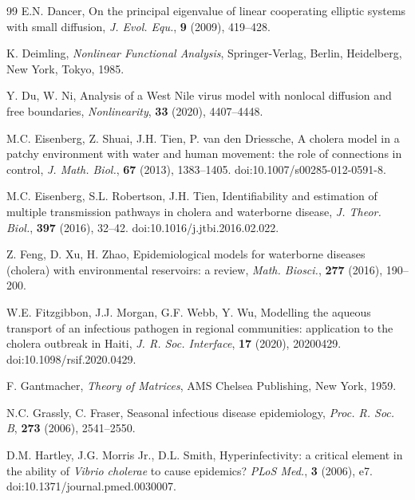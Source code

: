 \documentclass[a4paper,11pt]{amsart}
\theoremstyle{definition}
\numberwithin{equation}{section}
\theoremstyle{definition}
\begin{document}
\begin{thebibliography}{99}
E.N. Dancer,
On the principal eigenvalue of linear cooperating elliptic systems with small diffusion,
\textit{J. Evol. Equ.}, \textbf{9} (2009), 419--428.

K. Deimling,
\textit{Nonlinear Functional Analysis},
Springer-Verlag, Berlin, Heidelberg, New York, Tokyo, 1985.







Y. Du, W. Ni,
Analysis of a West Nile virus model with nonlocal diffusion and free boundaries,
\textit{Nonlinearity}, \textbf{33} (2020), 4407--4448.






M.C. Eisenberg, Z. Shuai, J.H. Tien, P. van den Driessche,
A cholera model in a patchy environment with water and human movement: the role of connections in control,
\textit{J. Math. Biol.}, \textbf{67} (2013), 1383--1405.
doi:10.1007/s00285-012-0591-8.

M.C. Eisenberg, S.L. Robertson, J.H. Tien,
Identifiability and estimation of multiple transmission pathways in cholera and waterborne disease,
\textit{J. Theor. Biol.}, \textbf{397} (2016), 32--42.
doi:10.1016/j.jtbi.2016.02.022.




Z. Feng, D. Xu, H. Zhao,
Epidemiological models for waterborne diseases (cholera) with environmental reservoirs: a review,
\textit{Math. Biosci.}, \textbf{277} (2016), 190--200.

W.E. Fitzgibbon, J.J. Morgan, G.F. Webb, Y. Wu,
Modelling the aqueous transport of an infectious pathogen in regional communities: application to the cholera outbreak in Haiti,
\textit{J. R. Soc. Interface}, \textbf{17} (2020), 20200429.
doi:10.1098/rsif.2020.0429.



F. Gantmacher,
\textit{Theory of Matrices},
AMS Chelsea Publishing, New York, 1959.

N.C. Grassly, C. Fraser,
Seasonal infectious disease epidemiology,
\textit{Proc. R. Soc. B}, \textbf{273} (2006), 2541--2550.



D.M. Hartley, J.G. Morris Jr., D.L. Smith,
Hyperinfectivity: a critical element in the ability of \textit{Vibrio cholerae} to cause epidemics?
\textit{PLoS Med.}, \textbf{3} (2006), e7.
doi:10.1371/journal.pmed.0030007.


\end{thebibliography}
\end{document}
